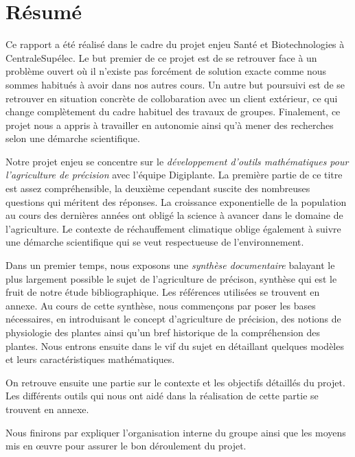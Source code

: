 \section{Résumé}
Ce rapport a été réalisé dans le cadre du projet enjeu Santé
et Biotechnologies à CentraleSupélec.
Le but premier de ce projet est de se retrouver face
à un problème ouvert où il n'existe pas forcément de solution exacte
comme nous sommes habitués à avoir dans nos autres cours.
Un autre but poursuivi est de se retrouver en situation concrète
de collobaration avec un client extérieur,
ce qui change complètement du cadre habituel des travaux de groupes.
Finalement, ce projet nous a appris à travailler en autonomie ainsi
qu'à mener des recherches selon une démarche scientifique.

Notre projet enjeu se concentre sur
le \emph{développement d'outils mathématiques 
pour l'agriculture de précision} avec l'équipe Digiplante.
La première partie de ce titre est assez compréhensible,
la deuxième cependant suscite des nombreuses questions qui méritent
des réponses.
La croissance exponentielle de la population au cours des dernières
années ont obligé la science à avancer dans le domaine de l'agriculture.
Le contexte de réchauffement climatique oblige également 
à suivre une démarche scientifique qui se veut respectueuse 
de l'environnement.

Dans un premier temps, nous exposons une \emph{synthèse documentaire}
balayant le plus largement possible le sujet de l'agriculture de précison,
synthèse qui est le fruit de notre étude bibliographique.
Les références utilisées se trouvent en annexe.
Au cours de cette synthèse, nous commençons par poser les bases
nécessaires, en introduisant le concept
d'agriculture de précision, des notions de physiologie des plantes
ainsi qu'un bref historique de la compréhension des plantes.
Nous entrons ensuite dans le vif du sujet en détaillant quelques modèles
et leurs caractéristiques mathématiques.

On retrouve ensuite une partie sur le contexte
et les objectifs détaillés du projet.
Les différents outils qui nous ont aidé dans la réalisation de
cette partie se trouvent en annexe.

Nous finirons par expliquer l'organisation interne du groupe
ainsi que les moyens mis en \oe{}uvre pour assurer
le bon déroulement du projet.
